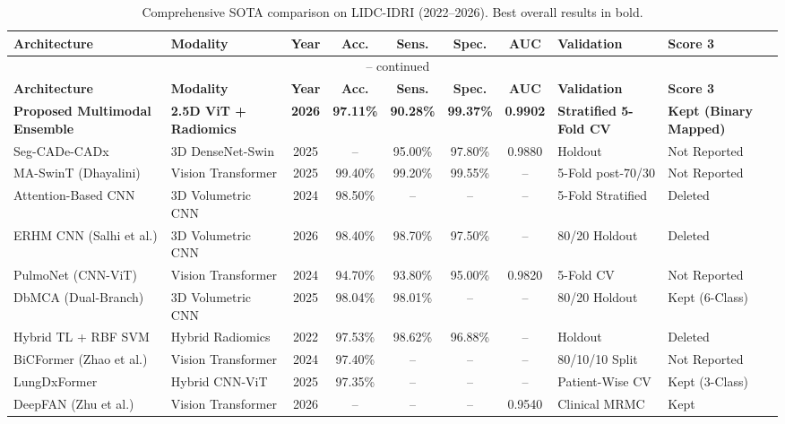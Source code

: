 \documentclass[AMA,STIX1COL]{WileyNJD-v2}
\begin{document}
\begin{longtable}{p{3.2cm} p{2.1cm} c c c c c p{1.8cm} p{1.7cm}}
\caption{Comprehensive SOTA comparison on LIDC-IDRI (2022--2026). Best overall results in bold.}\label{tab:sota}\\
\toprule
\textbf{Architecture} & \textbf{Modality} & \textbf{Year} & \textbf{Acc.} & \textbf{Sens.} & \textbf{Spec.} & \textbf{AUC} & \textbf{Validation} & \textbf{Score 3}\\
\midrule
\endfirsthead
\multicolumn{9}{c}{\tablename~\thetable{} -- continued}\\
\toprule
\textbf{Architecture} & \textbf{Modality} & \textbf{Year} & \textbf{Acc.} & \textbf{Sens.} & \textbf{Spec.} & \textbf{AUC} & \textbf{Validation} & \textbf{Score 3}\\
\midrule
\endhead
\bottomrule
\endlastfoot
\textbf{Proposed Multimodal Ensemble} & \textbf{2.5D ViT + Radiomics} & \textbf{2026} & \textbf{97.11\%} & \textbf{90.28\%} & \textbf{99.37\%} & \textbf{0.9902} & \textbf{Stratified 5-Fold CV} & \textbf{Kept (Binary Mapped)} \\
\midrule
Seg-CADe-CADx & 3D DenseNet-Swin & 2025 & -- & 95.00\% & 97.80\% & 0.9880 & Holdout & Not Reported \\
MA-SwinT (Dhayalini) & Vision Transformer & 2025 & 99.40\% & 99.20\% & 99.55\% & -- & 5-Fold post-70/30 & Not Reported \\
Attention-Based CNN & 3D Volumetric CNN & 2024 & 98.50\% & -- & -- & -- & 5-Fold Stratified & Deleted \\
ERHM CNN (Salhi et al.) & 3D Volumetric CNN & 2026 & 98.40\% & 98.70\% & 97.50\% & -- & 80/20 Holdout & Deleted \\
PulmoNet (CNN-ViT) & Vision Transformer & 2024 & 94.70\% & 93.80\% & 95.00\% & 0.9820 & 5-Fold CV & Not Reported \\
DbMCA (Dual-Branch) & 3D Volumetric CNN & 2025 & 98.04\% & 98.01\% & -- & -- & 80/20 Holdout & Kept (6-Class) \\
Hybrid TL + RBF SVM & Hybrid Radiomics & 2022 & 97.53\% & 98.62\% & 96.88\% & -- & Holdout & Deleted \\
BiCFormer (Zhao et al.) & Vision Transformer & 2024 & 97.40\% & -- & -- & -- & 80/10/10 Split & Not Reported \\
LungDxFormer & Hybrid CNN-ViT & 2025 & 97.35\% & -- & -- & -- & Patient-Wise CV & Kept (3-Class) \\
DeepFAN (Zhu et al.) & Vision Transformer & 2026 & -- & -- & -- & 0.9540 & Clinical MRMC & Kept \\

\end{longtable}
\end{document}
